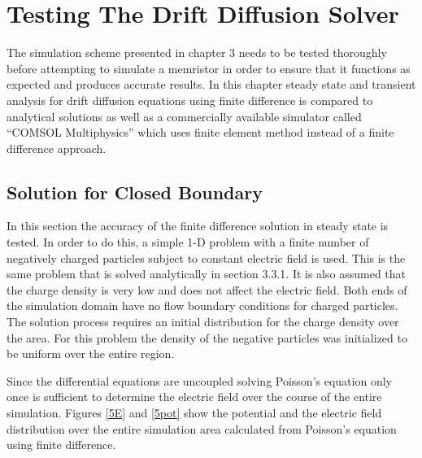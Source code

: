 \chapter{Testing The Drift Diffusion Solver} %

\label{Chapter5} %


\begin{doublespace}

 The simulation scheme presented in chapter 3 needs to be tested thoroughly before attempting to simulate a memristor in order to ensure that it functions as expected and produces accurate results. In this chapter steady state and transient analysis for drift diffusion equations using finite difference is compared to analytical solutions as well as a commercially available simulator called ``COMSOL Multiphysics'' \tjs{[REF]} which uses  finite element method instead of a finite difference approach.

\section{Solution for Closed Boundary}
In this section the accuracy of the finite difference solution in steady state is tested. In order to do this, a simple 1-D problem with a finite number of negatively charged particles  subject to constant electric field is used. This is the same problem that is solved analytically in section 3.3.1. It is also assumed that the charge density is very low and does not affect the electric field. Both ends of the simulation domain have no flow boundary conditions for charged particles. The solution process requires an initial distribution for the charge density over the area. For this problem the density of the negative particles was initialized to be uniform over the entire region. 

Since the differential equations are uncoupled solving Poisson's equation only once is sufficient to determine the electric field over the course of the entire simulation. Figures \ref{5E} and \ref{5pot} show the potential and the electric field distribution over the entire simulation area calculated from Poisson's equation using finite difference. 


\end{doublespace}
